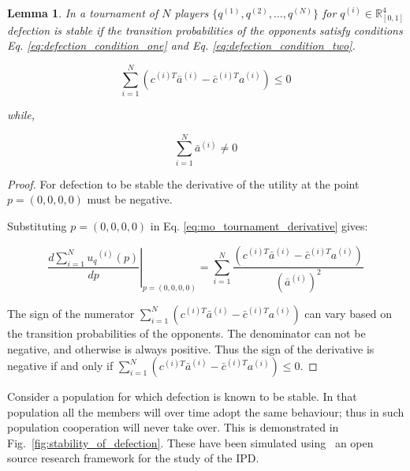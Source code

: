 \documentclass[10pt]{article}
\newcommand{\R}{\mathbb{R}}
\newtheorem{lemma}[theorem]{Lemma}
\begin{document}
\begin{lemma}\label{lemma:stability_of_defection}
    In a tournament of \(N\) players \(\{q^{(1)}, q^{(2)}, \dots, q^{(N)} \}\)
    for \(q^{(i)} \in \R_{[0, 1]} ^ 4\)
    defection is stable if the transition probabilities of the
    opponents satisfy conditions Eq. \ref{eq:defection_condition_one} and Eq. \ref{eq:defection_condition_two}.

    \begin{equation}\label{eq:defection_condition_one}
        \sum_{i=1} ^ N (c^{(i)T} \bar{a}^{(i)} - \bar{c}^{(i)T} a^{(i)}) \leq 0
    \end{equation}

    while,

    \begin{equation}\label{eq:defection_condition_two}
        \sum_{i=1} ^ N \bar{a}^{(i)} \neq 0
    \end{equation}
\end{lemma}

\begin{proof}
    For defection to be stable the derivative of the utility
    at the point \(p = (0, 0, 0, 0)\) must be negative.

    Substituting \(p = (0, 0, 0, 0)\) in
    Eq. \ref{eq:mo_tournament_derivative} gives:

    \begin{equation}
        \left.\frac{d\sum\limits_{i=1} ^ {N} {u_q}^{(i)} (p)}{dp} \right\rvert_{p=(0,0,0,0)} =
    \sum_{i=1} ^ N \frac{(c^{(i)T} \bar{a}^{(i)} - \bar{c}^{(i)T} a^{(i)})}
    {(\bar{a}^{(i)})^2}
    \end{equation}

    The sign of the numerator \( \displaystyle\sum_{i=1} ^ N (c^{(i)T} \bar{a}^{(i)} - \bar{c}^{(i)T} a^{(i)})\)
    can vary based on the transition probabilities of the opponents.
    The denominator can not be negative, and otherwise is always positive.
    Thus the sign of the derivative is negative if and only if
    \( \displaystyle\sum_{i=1} ^ N (c^{(i)T} \bar{a}^{(i)} - \bar{c}^{(i)T} a^{(i)}) \leq 0\).
\end{proof}

Consider a population for which defection is known to be stable. In that
population all the members will over time adopt the same behaviour; thus in such
population cooperation will never take over. This is demonstrated in
Fig.~\ref{fig:stability_of_defection}.
These have been simulated using~\cite{axelrodproject} an open
source research framework for the study of the IPD.
\end{document}
